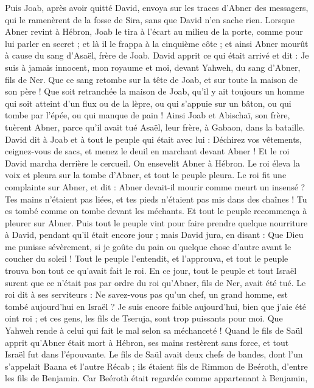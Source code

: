 \begin{multicols}{2}
Puis Joab, après avoir quitté David, envoya sur les traces d’Abner des messagers, qui le ramenèrent de la fosse de Sira, sans que David n’en sache rien.
Lorsque Abner revint à Hébron, Joab le tira à l’écart au milieu de la porte, comme pour lui parler en secret ; et là il le frappa à la cinquième côte ; et ainsi Abner mourût à cause du sang d’Asaël, frère de Joab.
David apprit ce qui était arrivé et dit : Je suis à jamais innocent, mon royaume et moi, devant Yahweh, du sang d'Abner, fils de Ner.
Que ce sang retombe sur la tête de Joab, et sur toute la maison de son père ! Que soit retranchée la maison de Joab, qu'il y ait toujours un homme qui soit atteint d’un flux ou de la lèpre, ou qui s'appuie sur un bâton, ou qui tombe par l'épée, ou qui manque de pain !
Ainsi Joab et Abischaï, son frère, tuèrent Abner, parce qu'il avait tué Asaël, leur frère, à Gabaon, dans la bataille.
David dit à Joab et à tout le peuple qui était avec lui : Déchirez vos vêtements, ceignez-vous de sacs, et menez le deuil en marchant devant Abner ! Et le roi David marcha derrière le cercueil.
On ensevelit Abner à Hébron. Le roi éleva la voix et pleura sur la tombe d'Abner, et tout le peuple pleura.
Le roi fit une complainte sur Abner, et dit : Abner devait-il mourir comme meurt un insensé ?
Tes mains n'étaient pas liées, et tes pieds n'étaient pas mis dans des chaînes ! Tu es tombé comme on tombe devant les méchants. Et tout le peuple recommença à pleurer sur Abner.
Puis tout le peuple vint pour faire prendre quelque nourriture à David, pendant qu'il était encore jour ; mais David jura, en disant : Que Dieu me punisse sévèrement, si je goûte du pain ou quelque chose d’autre avant le coucher du soleil !
Tout le peuple l'entendit, et l’approuva, et tout le peuple trouva bon tout ce qu’avait fait le roi.
En ce jour, tout le peuple et tout Israël surent que ce n’était pas par ordre du roi qu'Abner, fils de Ner, avait été tué.
Le roi dit à ses serviteurs : Ne savez-vous pas qu'un chef, un grand homme, est tombé aujourd'hui en Israël ?
Je suis encore faible aujourd'hui, bien que j'aie été oint roi ; et ces gens, les fils de Tseruja, sont trop puissants pour moi. Que Yahweh rende à celui qui fait le mal selon sa méchanceté !
\VerseOne{}Quand le fils de Saül apprit qu'Abner était mort à Hébron, ses mains restèrent sans force, et tout Israël fut dans l’épouvante.
Le fils de Saül avait deux chefs de bandes, dont l'un s’appelait Baana et l'autre Récab ; ils étaient fils de Rimmon de Beéroth, d’entre les fils de Benjamin. Car Beéroth était regardée comme appartenant à Benjamin,

\end{multicols}
